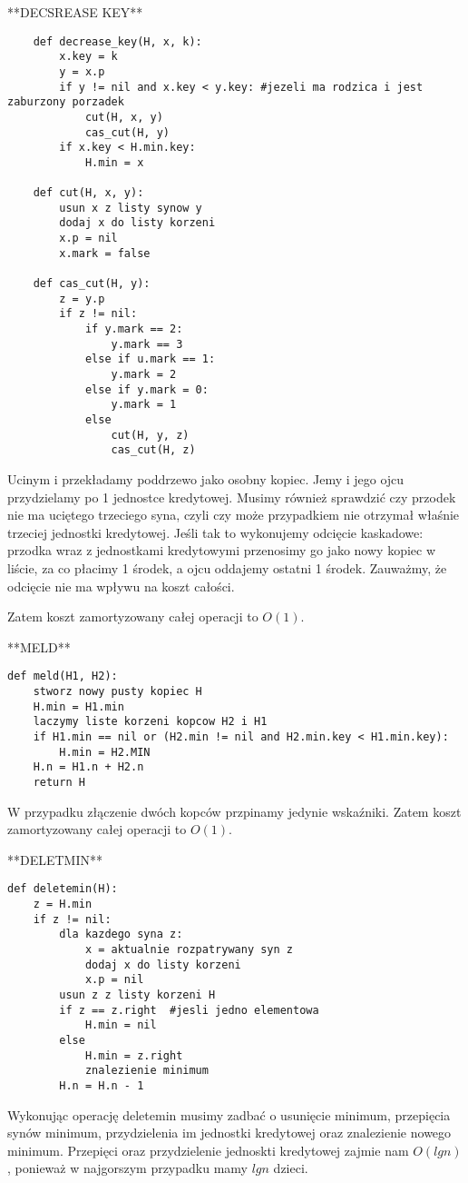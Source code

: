 \documentclass[12pt]{article}
\begin{document}
**DECSREASE KEY**
\begin{lstlisting}
    def decrease_key(H, x, k):
        x.key = k
        y = x.p
        if y != nil and x.key < y.key: #jezeli ma rodzica i jest zaburzony porzadek
            cut(H, x, y)
            cas_cut(H, y)
        if x.key < H.min.key:
            H.min = x

    def cut(H, x, y):
        usun x z listy synow y
        dodaj x do listy korzeni
        x.p = nil
        x.mark = false
        
    def cas_cut(H, y):
        z = y.p
        if z != nil:
            if y.mark == 2:
                y.mark == 3
            else if u.mark == 1:
                y.mark = 2
            else if y.mark = 0:
                y.mark = 1
            else 
                cut(H, y, z)
                cas_cut(H, z)
\end{lstlisting}
Ucinym i przekładamy poddrzewo jako osobny kopiec. Jemy i jego ojcu przydzielamy po 1 jednostce kredytowej.
Musimy również sprawdzić czy przodek nie ma  uciętego trzeciego syna, czyli czy może przypadkiem nie otrzymał właśnie trzeciej jednostki kredytowej. Jeśli tak to wykonujemy odcięcie kaskadowe: przodka wraz z jednostkami kredytowymi przenosimy go jako nowy kopiec w liście, za co płacimy 1 środek, a ojcu oddajemy ostatni 1 środek. Zauważmy, że odcięcie nie ma wpływu na koszt całości.

Zatem koszt zamortyzowany całej operacji to $O(1)$.

**MELD**
\begin{lstlisting}
def meld(H1, H2):
    stworz nowy pusty kopiec H
    H.min = H1.min
    laczymy liste korzeni kopcow H2 i H1
    if H1.min == nil or (H2.min != nil and H2.min.key < H1.min.key):
        H.min = H2.MIN
    H.n = H1.n + H2.n
    return H
\end{lstlisting}
W przypadku złączenie dwóch kopców przpinamy jedynie wskaźniki.
Zatem koszt zamortyzowany całej operacji to $O(1)$.


**DELETMIN**
\begin{lstlisting}
def deletemin(H):
    z = H.min
    if z != nil:
        dla kazdego syna z:
            x = aktualnie rozpatrywany syn z
            dodaj x do listy korzeni
            x.p = nil
        usun z z listy korzeni H
        if z == z.right  #jesli jedno elementowa
            H.min = nil
        else 
            H.min = z.right
            znalezienie minimum 
        H.n = H.n - 1
\end{lstlisting}
Wykonując operację deletemin musimy zadbać o usunięcie minimum, przepięcia synów minimum, przydzielenia im jednostki kredytowej oraz znalezienie nowego minimum. 
Przepięci oraz przydzielenie jednoskti kredytowej zajmie nam $O(lgn)$, ponieważ w najgorszym przypadku mamy $lgn$ dzieci.
\end{document}
